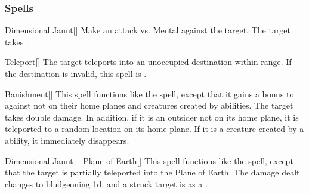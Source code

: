 \subsubsection{Spells}


\lowercase{\hypertarget{spell:Dimensional Jaunt}{}}\label{spell:Dimensional Jaunt}
\begin{freeability}[\nth{1}]{\hypertarget{spell:Dimensional Jaunt}{Dimensional Jaunt}}[]
Make an attack vs. Mental against the target.
\hit The target takes .
\end{freeability}
\vspace{0.25em}



\lowercase{\hypertarget{spell:Teleport}{}}\label{spell:Teleport}
\begin{freeability}[\nth{1}]{\hypertarget{spell:Teleport}{Teleport}}[]
The target teleports into an unoccupied destination within range.
If the destination is invalid, this spell is .
\end{freeability}
\vspace{0.25em}



\lowercase{\hypertarget{spell:Banishment}{}}\label{spell:Banishment}
\begin{freeability}[\nth{2}]{\hypertarget{spell:Banishment}{Banishment}}[]
This spell functions like the  spell, except that it gains a  bonus to  against  not on their home planes and creatures created by  abilities.
\crit The target takes double damage.
In addition, if it is an outsider not on its home plane, it is teleported to a random location on its home plane.
If it is a creature created by a  ability, it immediately disappears.
\end{freeability}
\vspace{0.25em}



\lowercase{\hypertarget{spell:Dimensional Jaunt -- Plane of Earth}{}}\label{spell:Dimensional Jaunt -- Plane of Earth}
\begin{freeability}[\nth{2}]{\hypertarget{spell:Dimensional Jaunt -- Plane of Earth}{Dimensional Jaunt -- Plane of Earth}}[]
This spell functions like the  spell, except that the target is partially teleported into the Plane of Earth.
The damage dealt changes to bludgeoning  \minus1d, and a struck target is  as a .
\end{freeability}
\vspace{0.25em}



